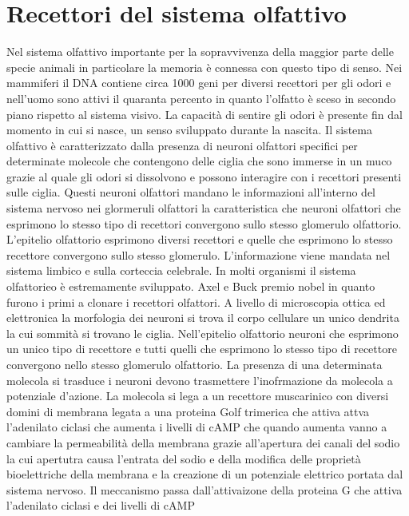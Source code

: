 \section{Recettori del sistema olfattivo}
Nel sistema olfattivo importante per la sopravvivenza della maggior parte delle specie animali in particolare la memoria \`e connessa con questo tipo di senso. Nei mammiferi il DNA 
contiene circa 1000 geni per diversi recettori per gli odori e nell'uomo sono attivi il quaranta percento in quanto l'olfatto \`e sceso in secondo piano rispetto al sistema visivo. 
La capacit\`a di sentire gli odori \`e presente fin dal momento in cui si nasce, un senso sviluppato durante la nascita. Il sistema olfattivo \`e caratterizzato dalla presenza di 
neuroni olfattori specifici per determinate molecole che contengono delle ciglia che sono immerse in un muco grazie al quale gli odori si dissolvono e possono interagire con i recettori
presenti sulle ciglia. Questi neuroni olfattori mandano le informazioni all'interno del sistema nervoso nei glormeruli olfattori la caratteristica che neuroni olfattori che esprimono 
lo stesso tipo di recettori convergono sullo stesso glomerulo olfattorio. L'epitelio olfattorio esprimono diversi recettori e quelle che esprimono lo stesso recettore convergono sullo
stesso glomerulo. L'informazione viene mandata nel sistema limbico e sulla corteccia celebrale. In molti organismi il sistema olfattorieo \`e estremamente sviluppato. Axel e Buck premio
nobel in quanto furono i primi a clonare i recettori olfattori. A livello di microscopia ottica ed elettronica la morfologia dei neuroni si trova il corpo cellulare un unico dendrita la
cui sommit\`a si trovano le ciglia. Nell'epitelio olfattorio neuroni che esprimono un unico tipo di recettore e tutti quelli che esprimono lo stesso tipo di recettore convergono nello
stesso glomerulo olfattorio. La presenza di una determinata molecola si trasduce i neuroni devono trasmettere l'inofrmazione da molecola a potenziale d'azione. La molecola si lega a 
un recettore muscarinico con diversi domini di membrana legata a una proteina Golf trimerica che attiva attva l'adenilato ciclasi che aumenta i livelli di cAMP che quando aumenta vanno
a cambiare la permeabilit\`a della membrana grazie all'apertura dei canali del sodio la cui apertutra causa l'entrata del sodio e della modifica delle propriet\`a bioelettriche della
membrana e la creazione di un potenziale elettrico portata dal sistema nervoso. Il meccanismo passa dall'attivaizone della proteina G che attiva l'adenilato ciclasi e dei livelli di cAMP
